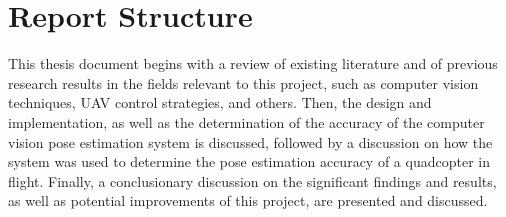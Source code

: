 \section{Report Structure}

This thesis document begins with a review of existing literature and of previous research results in the fields relevant to this project, such as computer vision techniques, UAV control strategies, and others. Then, the design and implementation, as well as the determination of the accuracy of the computer vision pose estimation system is discussed, followed by a discussion on how the system was used to determine the pose estimation accuracy of a quadcopter in flight. Finally, a conclusionary discussion on the significant findings and results, as well as potential improvements of this project, are presented and discussed. 
